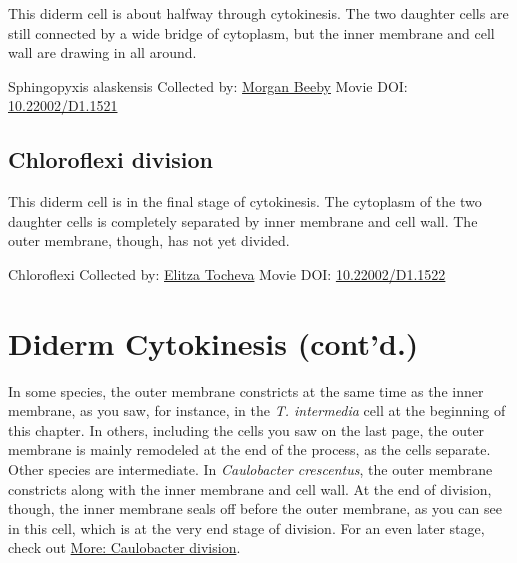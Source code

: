 \documentclass[]{tufte-book}
\begin{document}
This diderm cell is about halfway through cytokinesis. The two daughter cells are still connected by a wide bridge of cytoplasm, but the inner membrane and cell wall are drawing in all around.



\hypertarget{htmlwidget-5a5e4a5bf8eacfc92911}{}

\label{fig:5-6a}Sphingopyxis alaskensis Collected by: \protect\hyperlink{morgan_beeby}{Morgan Beeby} Movie DOI: \href{https://doi.org/10.22002/D1.1521}{10.22002/D1.1521}

\hypertarget{Chloroflexi_division}{%
\subsection{Chloroflexi division}\label{Chloroflexi_division}}

This diderm cell is in the final stage of cytokinesis. The cytoplasm of the two daughter cells is completely separated by inner membrane and cell wall. The outer membrane, though, has not yet divided.



\hypertarget{htmlwidget-8bcba24eb0e978778d4f}{}

\label{fig:5-6b}Chloroflexi Collected by: \protect\hyperlink{elitza_tocheva}{Elitza Tocheva} Movie DOI: \href{https://doi.org/10.22002/D1.1522}{10.22002/D1.1522}

\hypertarget{diderm-cytokinesis-contd.}{%
\section{Diderm Cytokinesis (cont'd.)}\label{diderm-cytokinesis-contd.}}

In some species, the outer membrane constricts at the same time as the inner membrane, as you saw, for instance, in the \emph{T. intermedia} cell at the beginning of this chapter. In others, including the cells you saw on the last page, the outer membrane is mainly remodeled at the end of the process, as the cells separate. Other species are intermediate. In \emph{Caulobacter crescentus}, the outer membrane constricts along with the inner membrane and cell wall. At the end of division, though, the inner membrane seals off before the outer membrane, as you can see in this cell, which is at the very end stage of division. For an even later stage, check out \protect\hyperlink{Caulobacter_division}{More: Caulobacter division}.



\hypertarget{htmlwidget-3b3bb92d66ce1cda29cb}{}
\end{document}
